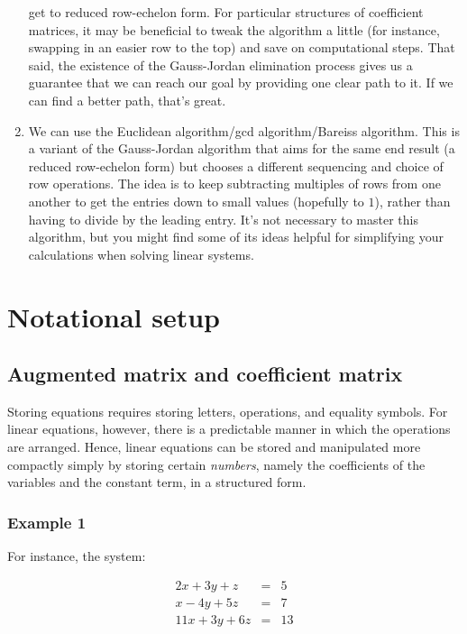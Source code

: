 \documentclass[10pt]{amsart}
\begin{document}
\begin{enumerate}
  get to reduced row-echelon form. For particular structures of
  coefficient matrices, it may be beneficial to tweak the algorithm a
  little (for instance, swapping in an easier row to the top) and save
  on computational steps. That said, the existence of the Gauss-Jordan
  elimination process gives us a guarantee that we can reach our goal
  by providing one clear path to it. If we can find a better path,
  that's great.
\item We can use the Euclidean algorithm/gcd algorithm/Bareiss
  algorithm. This is a variant of the Gauss-Jordan algorithm that aims
  for the same end result (a reduced row-echelon form) but chooses a
  different sequencing and choice of row operations. The idea is to
  keep subtracting multiples of rows from one another to get the
  entries down to small values (hopefully to $1$), rather than having
  to divide by the leading entry. It's not necessary to master this
  algorithm, but you might find some of its ideas helpful for
  simplifying your calculations when solving linear systems.
\end{enumerate}

\section{Notational setup}

\subsection{Augmented matrix and coefficient matrix}

Storing equations requires storing letters, operations, and equality
symbols. For linear equations, however, there is a predictable manner
in which the operations are arranged. Hence, linear equations can be
stored and manipulated more compactly simply by storing certain {\em
  numbers}, namely the coefficients of the variables and the constant
term, in a structured form. 

\subsubsection{Example 1}

For instance, the system:

\begin{eqnarray*}
  2x + 3y + z & = & 5\\
  x - 4y + 5z & = & 7\\
  11x + 3y + 6z & = & 13 \\
\end{eqnarray*}
\end{document}
